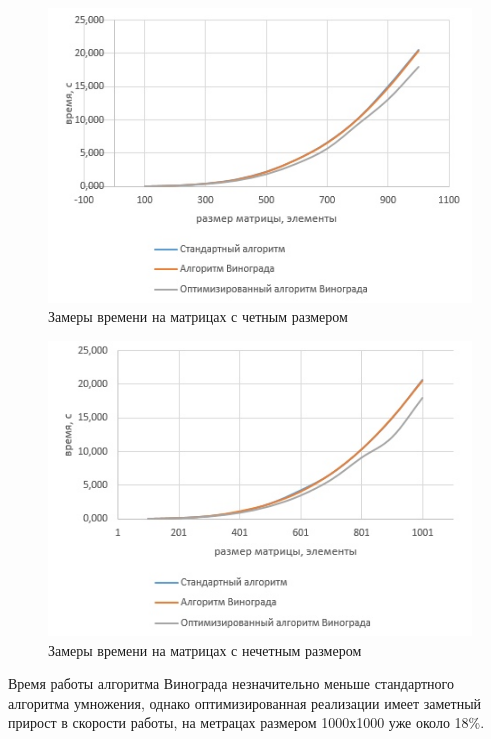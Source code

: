\documentclass[a4paper,12pt]{article}
\begin{document}
	\begin{center}
	\begin{figure}[H]	
        				{
        					\centering
        					\includegraphics[scale=0.7]{t1.jpg}
        					\caption{\label{ris:test1}Замеры времени на матрицах с четным размером}
        				}
        			\end{figure}
        		
        			\begin{figure}[H]	
        				{
        					\centering
        					\includegraphics[scale=0.7]{t2.jpg}
        					\caption{\label{ris:test2}Замеры времени на матрицах с нечетным размером}
        				}
        			\end{figure}
	\end{center}

	Время работы алгоритма Винограда незначительно меньше стандартного алгоритма умножения, однако оптимизированная реализации имеет заметный прирост в скорости работы, на метрацах размером 1000х1000 уже около 18\%.
\end{document}
